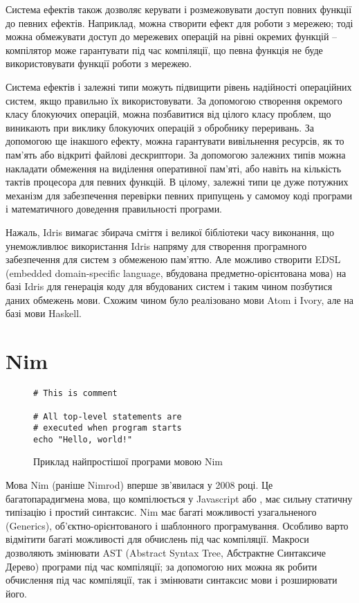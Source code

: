 \documentclass[main.tex]{subfiles}
\begin{document}
Система ефектів також дозволяє керувати і розмежовувати доступ повних функції до певних ефектів. Наприклад, можна створити ефект для роботи з мережею; тоді можна обмежувати доступ до мережевих операцій на рівні окремих функцій -- компілятор може гарантувати під час компіляції, що певна функція не буде використовувати функції роботи з мережею.

Система ефектів і залежні типи можуть підвищити рівень надійності операційних систем, якщо правильно їх використовувати. За допомогою створення окремого класу блокуючих операцій, можна позбавитися від цілого класу проблем, що виникають при виклику блокуючих операцій з обробнику переривань. За допомогою ще інакшого ефекту, можна гарантувати вивільнення ресурсів, як то пам'ять або відкриті файлові дескриптори. За допомогою залежних типів можна накладати обмеження на виділення оперативної пам'яті, або навіть на кількість тактів процесора для певних функцій. В цілому, залежні типи це дуже потужних механізм для забезпечення перевірки певних припущень у самомоу коді програми і математичного доведення правильності програми.

Нажаль, Idris вимагає збирача сміття і великої бібліотеки часу виконання, що унеможливлює використання Idris напряму для створення програмного забезпечення для систем з обмеженою пам'яттю. Але можливо створити EDSL (embedded domain-specific language, вбудована предметно-орієнтована мова) на базі Idris для генерація коду для вбудованих систем і таким чином позбутися даних обмежень мови. Схожим чином було реалізовано мови Atom\cite{haskell:atom} і Ivory\cite{haskell:ivory}, але на базі мови Haskell\cite{haskell}.

\section{Nim}

\begin{figure}[!bp]
  \centering
  \begin{verbatim}
# This is comment

# All top-level statements are
# executed when program starts
echo "Hello, world!"
  \end{verbatim}
  \caption{Приклад найпростішої програми мовою Nim}
  \label{example:nim}
\end{figure}

Мова Nim\cite{nim} (раніше Nimrod) вперше зв'явилася у 2008 році. Це багатопарадигмена мова, що компілюється у Javascript або \LangC{}, має сильну статичну типізацію і простий синтаксис. Nim має багаті можливості узагальненого (Generics), об'єктно-орієнтованого і шаблонного програмування. Особливо варто відмітити багаті можливості для обчислень під час компіляції. Макроси дозволяють змінювати AST (Abstract Syntax Tree, Абстрактне Синтаксиче Дерево) програми під час компіляції; за допомогою них можна як робити обчислення під час компіляції, так і змінювати синтаксис мови і розширювати його.
\end{document}

